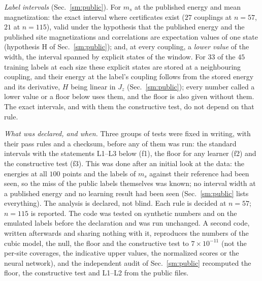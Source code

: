 \documentclass[aps,prx,onecolumn,10pt,nofootinbib,longbibliography,floatfix]{revtex4-2}
\theoremstyle{remark}
\newcommand{\Jz}{J_z}
\newcommand{\ms}{m_s}
\begin{document}
\emph{Label intervals} (Sec.~\ref{sm:public}). For $\ms$ at the published energy and mean magnetization: the exact
interval where certificates exist ($27$ couplings at $n=57$, $21$ at $n=115$), valid under the hypothesis that the %
published energy and the published site magnetizations and correlations are expectation values of one state
(hypothesis H of Sec.~\ref{sm:public}); and, at every coupling, a
\emph{lower value} of the width, the interval spanned by explicit states of the window. For $33$ of the $45$ %
training labels at each size these explicit states are stored at a neighbouring coupling, and their energy at the
label's coupling follows from the stored energy and its derivative, $H$ being linear in $\Jz$
(Sec.~\ref{sm:public}); every number called a lower value or a floor below uses them, and the floor is also given
without them. The exact intervals, and with them the constructive test, do not depend on that rule.

\emph{What was declared, and when.} Three groups of tests were fixed in writing, with their pass rules and a
checksum, before any of them was run: the standard intervals with the statements L1--L3 below (f1), the floor for
any learner (f2) and the constructive test (f3). This was done after an initial look at the data: the energies at
all $100$ points and the labels of $\ms$ against their reference had been seen, so the miss of the public labels %
themselves was known; no interval width at a published energy and no learning result had been seen
(Sec.~\ref{sm:public} lists everything). The analysis is declared, not blind. Each rule is decided at $n=57$; %
$n=115$ is reported. The code was tested on synthetic numbers and on the emulated labels before the declaration and %
was run unchanged. A second code, written afterwards and sharing nothing with it, reproduces the numbers of the
cubic model, the null, the floor and the constructive test to $7\times10^{-11}$ (not the per-site coverages, the %
indicative upper values, the normalized scores or the neural network), and the independent audit of
Sec.~\ref{sm:public} recomputed the floor, the constructive test and L1--L2 from the public files.
\end{document}
